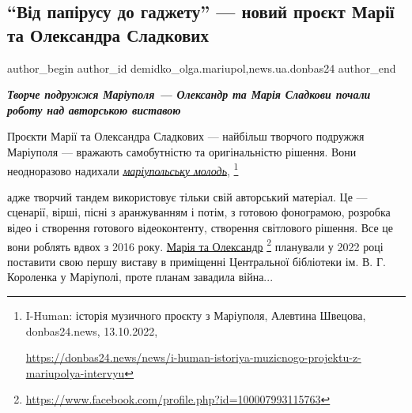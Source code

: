  
 
 
 
 
 
\subsection{\enquote{Від папірусу до гаджету} — новий проєкт Марії та Олександра Сладкових}
\label{sec:25_10_2022.stz.news.ua.donbas24.1.vid_papirusu_do_gadzhetu_sladkovy}
 
\ifcmt
 author_begin
   author_id demidko_olga.mariupol,news.ua.donbas24
 author_end
\fi


\begin{center}
  \em\color{blue}\bfseries\Large
Творче подружжя Маріуполя — Олександр та Марія Сладкови почали роботу над авторською виставою 
\end{center}

Проєкти Марії та Олександра Сладкових — найбільш творчого подружжя Маріуполя —
вражають самобутністю та оригінальністю рішення. Вони неодноразово надихали
\href{https://donbas24.news/news/i-human-istoriya-muzicnogo-projektu-z-mariupolya-intervyu}{\emph{маріупольську молодь}},%
\footnote{I-Human: історія музичного проєкту з Маріуполя, Алевтина Швецова, donbas24.news, 13.10.2022, \par\url{https://donbas24.news/news/i-human-istoriya-muzicnogo-projektu-z-mariupolya-intervyu}}

адже творчий тандем використовує тільки свій авторський
матеріал. Це — сценарії, вірші, пісні з аранжуванням і потім, з готовою
фонограмою, розробка відео і створення готового відеоконтенту, створення
світлового рішення. Все це вони роблять вдвох з 2016 року. \href{https://www.facebook.com/profile.php?id=100007993115763}{Марія та Олександр}%
\footnote{\url{https://www.facebook.com/profile.php?id=100007993115763}} %
планували у 2022 році поставити свою першу виставу в приміщенні Центральної
бібліотеки ім. В. Г. Короленка у Маріуполі, проте планам завадила війна...


